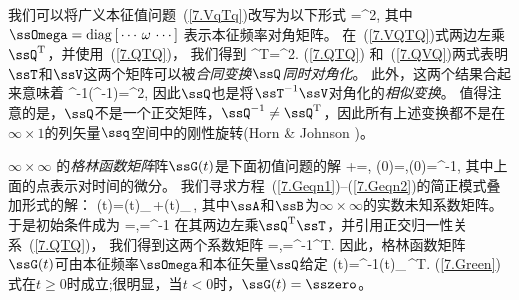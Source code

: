 我们可以将广义本征值问题~(\ref{7.VqTq})改写为以下形式
\eq
\label{7.VQTQ}
\ssV\ssQ=\ssT\ssQ\ssOmega^2,
\en
其中 $\ssOmega={\rm diag}_{\,}[\,\cdots\,\omega\,\cdots\,]$
表示本征频率对角矩阵。
在~(\ref{7.VQTQ})式两边左乘$\ssQ^{\rm T}$，并使用~(\ref{7.QTQ})，
我们得到
\eq
\label{7.QVQ}
\ssQ^{\rm T}\ssV\ssQ=\ssOmega^2.
\en
(\ref{7.QTQ}) 和~(\ref{7.QVQ})两式表明$\ssT$和$\ssV$这两个矩阵可以被{\em 合同变换\/}$\ssQ${\em 同时对角化\/}。
%
%
%
此外，这两个结果合起来意味着
\eq
\label{7.QTVQ}
\ssQ^{-1}(\ssT^{-1}\ssV)\ssQ=\ssOmega^2,
\en
因此$\ssQ$也是将$\ssT^{-1}\ssV$对角化的{\em 相似变换\/}。
%
%
值得注意的是，$\ssQ$不是一个正交矩阵，$\ssQ^{-1}\neq\ssQ^{\rm T}$，因此所有上述变换都不是在$\infty\times 1$的列矢量$\ssq$空间中的刚性旋转(Horn \& Johnson \citeyear{horn&johnson85})。

$\infty\times\infty$ 的{\em 格林函数矩阵\/}阵$\ssG(t)$是下面初值问题的解
%
%
\eq
\label{7.Geqn1}
\ssT\ddot{\ssG}+\ssV\ssG=\sszero,
\en
\eq
\label{7.Geqn2}
\ssG(0)=\sszero,\qquad\dot{\ssG}(0)=\ssT^{-1},
\en
其中上面的点表示对时间的微分。
我们寻求方程~(\ref{7.Geqn1})--(\ref{7.Geqn2})的简正模式叠加形式的解：
\eq
\ssG(t)=\ssQ\cos(\ssOmega t)_{\,}\ssA+\ssQ\sin(\ssOmega t)_{\,}\ssB,
\en
其中$\ssA$和$\ssB$为$\infty\times\infty$的实数未知系数矩阵。
于是初始条件成为
\eq
\ssQ\ssA=\sszero,\qquad\ssQ\ssOmega\ssB=\ssT^{-1}
\en
在其两边左乘$\ssQ^{\rm T}\ssT$，并引用正交归一性关系~(\ref{7.QTQ})，
我们得到这两个系数矩阵
\eq
\ssA=\sszero,\qquad\ssB=\ssOmega^{-1}\ssQ^{\rm T}.
\en
因此，格林函数矩阵$\ssG(t)$可由本征频率$\ssOmega$和本征矢量$\ssQ$给定
\eq
\label{7.Green}
\ssG(t)=\ssQ\ssOmega^{-1}\sin(\ssOmega t)_{\,}\ssQ^{\rm T}.
\en
(\ref{7.Green})式在$t\geq 0$时成立;很明显，当$t<0$时，$\ssG(t)=\sszero$。

